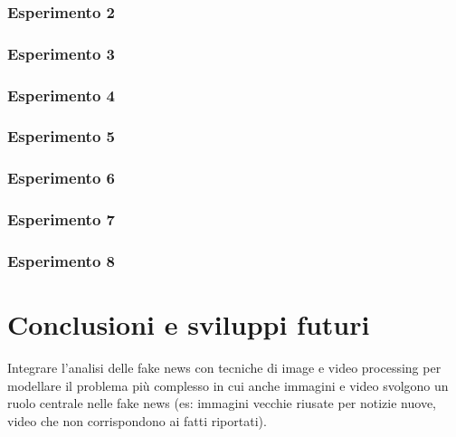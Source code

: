 \documentclass[12pt]{report}
\theoremstyle{definition}
\begin{document}
\subsection{Esperimento 2}
\subsection{Esperimento 3}
\subsection{Esperimento 4}
\subsection{Esperimento 5}
\subsection{Esperimento 6}
\subsection{Esperimento 7}
\subsection{Esperimento 8}

\chapter*{Conclusioni e sviluppi futuri}
\onehalfspacing

Integrare l'analisi delle fake news con tecniche di image e video processing per modellare il problema più complesso in cui anche immagini e video svolgono un ruolo centrale nelle fake news (es: immagini vecchie riusate per notizie nuove, video che non corrispondono ai fatti riportati).

\printbibliography

%
\end{document}
